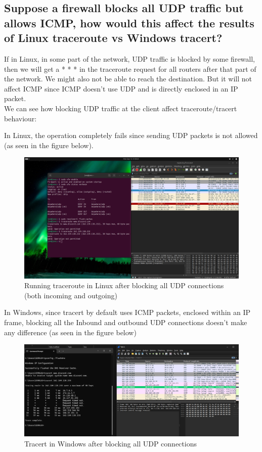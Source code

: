 \documentclass{article}
\begin{document}
\subsection{Suppose a firewall blocks all UDP traffic but allows ICMP, how would this affect the results of Linux traceroute vs Windows tracert?}

If in Linux, in some part of the network, UDP traffic is blocked by some firewall, then we will get a * * * in the traceroute request for all routers after that part of the network. We might also not be able to reach the destination. But it will not affect ICMP since ICMP doesn't use UDP and is directly enclosed in an IP packet.\\

\noindent We can see how blocking UDP traffic at the client affect traceroute/tracert behaviour:

\noindent In Linux, the operation completely fails since sending UDP packets is not allowed (as seen in the figure below).
\begin{figure}[H]
    \centering
    \includegraphics[width=1\linewidth]{traceroute discord block.png}
    \caption{Running traceroute in Linux after blocking all UDP connections (both incoming and outgoing)}
    \label{fig:13}
\end{figure}

In Windows, since tracert by default uses ICMP packets, enclosed within an IP frame, blocking all the Inbound and outbound UDP connections doesn't make any difference (as seen in the figure below)

\begin{figure}[H]
    \centering
    \includegraphics[width=1\linewidth]{tracert windows discord block.png}
    \caption{Tracert in Windows after blocking all UDP connections}
    \label{fig:placeholder}
\end{figure}
\end{document}
